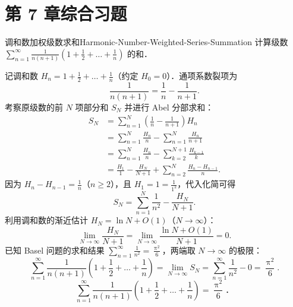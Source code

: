 \section{第 7 章综合习题}

\begin{problem}{调和数加权级数求和}{Harmonic-Number-Weighted-Series-Summation}
    计算级数 $\sum_{n=1}^\infty \frac{1}{n(n+1)}\left(1 + \frac{1}{2} + \dots + \frac{1}{n}\right)$ 的和．
\end{problem}

\begin{solution}
    记调和数 $H_n = 1 + \frac{1}{2} + \dots + \frac{1}{n}$（约定 $H_0 = 0$）．通项系数裂项为
    \begin{equation}
        \frac{1}{n(n+1)} = \frac{1}{n} - \frac{1}{n+1}.
    \end{equation}
    考察原级数的前 $N$ 项部分和 $S_N$ 并进行 Abel 分部求和：
    \begin{equation}
        \begin{aligned}
            S_N & = \sum_{n=1}^N \left( \frac{1}{n} - \frac{1}{n+1} \right) H_n             \\
                & = \sum_{n=1}^N \frac{H_n}{n} - \sum_{n=1}^N \frac{H_n}{n+1}               \\
                & = \sum_{n=1}^N \frac{H_n}{n} - \sum_{k=2}^{N+1} \frac{H_{k-1}}{k}         \\
                & = \frac{H_1}{1} - \frac{H_N}{N+1} + \sum_{n=2}^N \frac{H_n - H_{n-1}}{n}.
        \end{aligned}
    \end{equation}
    因为 $H_n - H_{n-1} = \frac{1}{n}$（$n \geqslant 2$），且 $H_1 = 1 = \frac{1}{1^2}$，代入化简可得
    \begin{equation}
        S_N = \sum_{n=1}^N \frac{1}{n^2} - \frac{H_N}{N+1}.
    \end{equation}
    利用调和数的渐近估计 $H_N = \ln N + O(1)$（$N \to \infty$）：
    \begin{equation}
        \lim_{N\to\infty} \frac{H_N}{N+1} = \lim_{N\to\infty} \frac{\ln N + O(1)}{N+1} = 0.
    \end{equation}
    已知 Basel 问题的求和结果 $\sum_{n=1}^\infty \frac{1}{n^2} = \frac{\uppi^2}{6}$，两端取 $N \to \infty$ 的极限：
    \begin{equation}
        \sum_{n=1}^\infty \frac{1}{n(n+1)}\left(1 + \frac{1}{2} + \dots + \frac{1}{n}\right) = \lim_{N\to\infty} S_N = \sum_{n=1}^\infty \frac{1}{n^2} - 0 = \frac{\uppi^2}{6}.
    \end{equation}
    \begin{equation}
        \boxed{\sum_{n=1}^\infty \frac{1}{n(n+1)}\left(1 + \frac{1}{2} + \dots + \frac{1}{n}\right) = \frac{\uppi^2}{6}．}
    \end{equation}
\end{solution}

